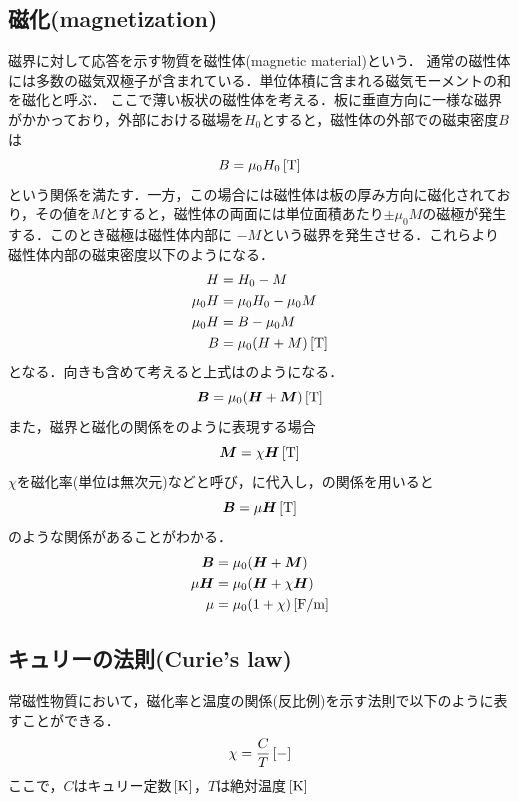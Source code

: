 \subsection{磁化(magnetization)\cite{11302042}}
磁界に対して応答を示す物質を磁性体(magnetic material)という．
通常の磁性体には多数の磁気双極子が含まれている．単位体積に含まれる磁気モーメントの和を磁化と呼ぶ．
ここで薄い板状の磁性体を考える．板に垂直方向に一様な磁界がかかっており，外部における磁場を$H_{0}$とすると，磁性体の外部での磁束密度$B$は
\begin{equation}	
	B=\mu_{0}H_{0}\,[\rm{T}]
\end{equation}
という関係を満たす．一方，この場合には磁性体は板の厚み方向に磁化されており，その値を$M$とすると，磁性体の両面には単位面積あたり$\pm \mu_{0}M$の磁極が発生する．このとき磁極は磁性体内部に
$-M$という磁界を発生させる．これらより磁性体内部の磁束密度以下のようになる．
\begin{align}
	H&=H_{0}-M\nonumber\\
	\mu_{0}H&=\mu_{0}H_{0}-\mu_{0}M\nonumber\\
	\mu_{0}H&=B-\mu_{0}M\nonumber\\
	B&=\mu_{0}(H+M)\,[\rm{T}]
\end{align}
となる．向きも含めて考えると上式はのようになる．
\begin{equation}
	\boldsymbol{B}=\mu_{0}(\boldsymbol{H}+\boldsymbol{M})\,[\rm{T}]
	\label{eq:mo}
\end{equation}
また，磁界と磁化の関係をのように表現する場合
\begin{equation}
	\boldsymbol{M}=\chi\boldsymbol{H}\,[\rm{T}]
	\label{eq:mmo}
\end{equation}
$\chi$を磁化率(単位は無次元)などと呼び，に代入し，の関係を用いると
\begin{equation}
	\boldsymbol{B}=\mu \boldsymbol{H}\,[\rm{T}]
	\label{eq:bh}
\end{equation}
のような関係があることがわかる．
\begin{align}
	\boldsymbol{B}&=\mu_{0}(\boldsymbol{H}+\boldsymbol{M})\nonumber\\
	\mu \boldsymbol{H}&=\mu_{0}(\boldsymbol{H}+\chi\boldsymbol{H})\nonumber\\
	\mu &=\mu_{0}(1+\chi)\,[\rm{F/m}]\label{eq:mu}
\end{align}

\subsection{キュリーの法則(Curie's law)\cite{76972}}
常磁性物質において，磁化率と温度の関係(反比例)を示す法則で以下のように表すことができる．
\begin{equation}
	\chi=\frac{C}{T}\,[\rm{-}]
\end{equation}
ここで，$C$はキュリー定数$\,[\rm{K}]$，$T$は絶対温度$\,[\rm{K}]$

